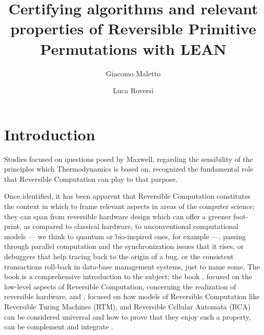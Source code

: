 \documentclass[runningheads]{llncs}
\newcommand{\LEAN}{\textsf{LEAN}\xspace}
\begin{document}
\title{Certifying algorithms and relevant properties of  Reversible Primitive Permutations with \LEAN}

\author{Giacomo Maletto \and
	    Luca Roversi}



\maketitle
\begin{abstract}
\end{abstract}

\section{Introduction}
\label{section:Introduction}
Studies focused on questions posed by Maxwell, regarding the sensibility of the principles which Thermodynamics is based on, recognized the fundamental role that Reversible Computation can play to that purpose.

Once identified, it has been apparent that Reversible Computation constitutes the context in which to frame relevant aspects in areas of the computer science; they can span from reversible hardware design which can offer a greener foot-print, as compared to classical hardware, to unconventional computational models --- we think to quantum or bio-inspired ones, for example ---, passing through parallel computation and the synchronization issues that it rises, or debuggers that help tracing back to the origin of a bug, or the consistent transactions roll-back in data-base management systems, just to name some. The book \cite{perumalla2013chc} is a comprehensive introduction to the subject; the book \cite{DBLP:books/daglib/0025734}, focused on the low-level aspects of Reversible Computation, concerning the realization of reversible hardware, and
\cite{DBLP:series/eatcs/Morita17}, focused on how models of Reversible Computation like Reversible Turing Machines (RTM), and Reversible Cellular Automata (RCA) can be considered universal and how to prove that they enjoy such a property, can be complement and integrate \cite{perumalla2013chc}.
\end{document}
